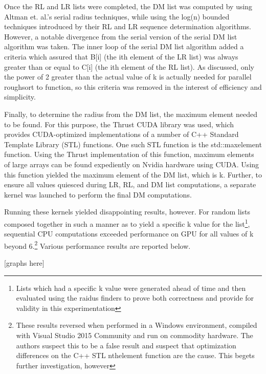 \documentclass[letterpaper, 12pt]{article}
\begin{document}
Once the RL and LR lists were completed, the DM list was computed by using Altman et. al.\textquoteright s serial radius techniques, while using the log(n) bounded techniques introduced by their RL and LR sequence determination algorithms.  However, a notable divergence from the serial version of the serial DM list algorithm was taken.  The inner loop of the serial DM list algorithm added a criteria which assured that B[i] (the ith element of the LR list) was always greater than or equal to C[i] (the ith element of the RL list).  As discussed, only the power of 2 greater than the actual value of k is actually needed for parallel roughsort to function, so this criteria was removed in the interest of efficiency and simplicity\cite{altman89}.

Finally, to determine the radius from the DM list, the maximum element needed to be found.  For this purpose, the Thrust CUDA library was used, which provides CUDA-optimized implementations of a number of C++ Standard Template Library (STL) functions\cite{thrust}.  One such STL function is the std::max\textunderscore element function.  Using the Thrust implementation of this function, maximum elements of large arrays can be found expediently on Nvidia hardware using CUDA\cite{extrema}.  Using this function yielded the maximum element of the DM list, which is k.  Further, to ensure all values quiesced during LR, RL, and DM list computations, a separate kernel was launched to perform the final DM computations.

Running these kernels yielded disappointing results, however.  For random lists composed together in such a manner as to yield a specific k value for the list\footnote{Lists which had a specific k value were generated ahead of time and then evaluated using the raidus finders to prove both correctness and provide for validity in this experimentation}, sequential CPU computations exceeded performance on GPU for all values of k beyond 6.\footnote{These results reversed when performed in a Windows environment, compiled with Visual Studio 2015 Community and run on commodity hardware.  The authors suspect this to be a false result and suspect that optimization differences on the C++ STL nth\textunderscore element function are the cause.  This begets further investigation, however}  Various performance results are reported below.

[graphs here]
\end{document}
